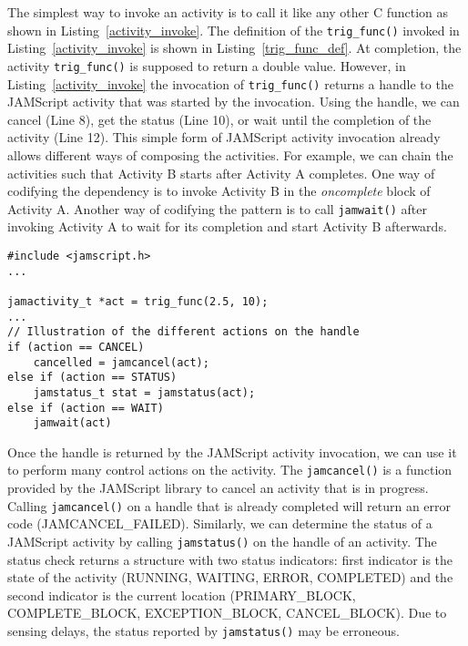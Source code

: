 \documentclass[11pt]{article}
\begin{document}
The simplest way to invoke an activity is to call it like any other C function
as shown in Listing~\ref{activity_invoke}.
The definition of the {\tt trig\_func()} invoked in Listing~\ref{activity_invoke} is
shown in Listing~\ref{trig_func_def}. At completion, the activity {\tt trig\_func()} is
supposed to return a double value. However, in Listing~\ref{activity_invoke}
the invocation of {\tt trig\_func()} returns a handle to the JAMScript activity that
was started by the invocation. Using the handle, we can cancel (Line 8), get the status
(Line 10), or
wait until the completion of the activity (Line 12).
This simple form of JAMScript activity invocation already allows different
ways of composing the activities. For example, we can chain the activities such that
Activity B starts after Activity A completes. One way of codifying the dependency
is to invoke Activity B in the {\em oncomplete} block of Activity A. Another way
of codifying the pattern is to call {\tt jamwait()} after invoking Activity A to wait
for its completion and start Activity B afterwards.


\begin{lstlisting}[caption=Simple invocation of a JAMScript activity, label=activity_invoke]
#include <jamscript.h>
...

jamactivity_t *act = trig_func(2.5, 10);
...
// Illustration of the different actions on the handle
if (action == CANCEL)
    cancelled = jamcancel(act);
else if (action == STATUS)
    jamstatus_t stat = jamstatus(act);
else if (action == WAIT)
    jamwait(act)
\end{lstlisting}


Once the handle is returned by the JAMScript activity invocation, we can use it
to perform many control actions on the activity. The {\tt jamcancel()} is a
function provided by the JAMScript library to cancel an activity that is in
progress. Calling {\tt jamcancel()} on a handle that is already completed will
return an error code (JAMCANCEL\_FAILED).  Similarly, we can determine the status
of a JAMScript activity by calling {\tt jamstatus()} on the handle of an
activity.  The status check returns a structure with two status indicators:
first  indicator is the state of the activity (RUNNING, WAITING, ERROR,
COMPLETED) and the second indicator is the current location (PRIMARY\_BLOCK,
COMPLETE\_BLOCK, EXCEPTION\_BLOCK, CANCEL\_BLOCK). Due to sensing delays, the
status reported by {\tt jamstatus()} may be erroneous.
\end{document}
